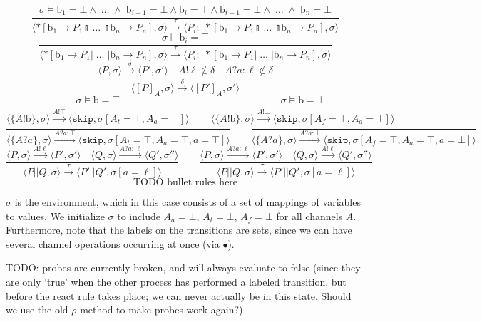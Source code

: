 \documentclass{article}
\begin{document}
$$    \frac{\sigma \models \mathrm{b}_1 = \bot \wedge \; \ldots \; \wedge \; \mathrm{b}_{i-1} = \bot \wedge \mathrm{b}_i = \top \wedge \mathrm{b}_{i+1} = \bot \wedge \; \ldots \; \wedge \; \mathrm{b}_n = \bot} {\langle *[ \mathrm{b}_1 \rightarrow P_1  \talloblong \; \ldots \; \talloblong \mathrm{b}_n \rightarrow P_n ] , \sigma \rangle \xrightarrow{\tau} \langle P_i; \; *[ \mathrm{b}_1 \rightarrow P_1  \talloblong \; \ldots \; \talloblong \mathrm{b}_n \rightarrow P_n ] , \sigma\rangle  } $$$$
    \frac{\sigma \models \mathrm{b}_i = \top} {\langle *[ \mathrm{b}_1 \rightarrow P_1  | \; \ldots \; | \mathrm{b}_n \rightarrow P_n ] , \sigma \rangle \xrightarrow{\tau} \langle P_i;\;*[ \mathrm{b}_1 \rightarrow P_1  | \; \ldots \; | \mathrm{b}_n \rightarrow P_n ] , \sigma\rangle  } $$$$
    \frac{\langle P, \sigma \rangle \xrightarrow{\delta} \langle P', \sigma' \rangle \quad A!\ell \not \in \delta \quad A?a:\ell \not \in \delta}{\langle [P]_A, \sigma \rangle \xrightarrow{\delta} \langle [P']_A, \sigma' \rangle} $$$$
    \frac{\sigma \models \mathrm{b} = \top}{\langle \{A!\mathrm{b}\}, \sigma \rangle \xrightarrow{A!\top} \langle \mathtt{skip}, \sigma[A_t = \top, A_a = \top] \rangle} \qquad
    \frac{\sigma \models \mathrm{b} = \bot}{\langle \{A!\mathrm{b}\}, \sigma \rangle \xrightarrow{A!\bot} \langle \mathtt{skip}, \sigma[A_f = \top, A_a = \top] \rangle} $$$$
    \frac{}{\langle \{A?a\}, \sigma \rangle \xrightarrow{A?a : \top} \langle \mathtt{skip}, \sigma[A_t = \top, A_a = \top, a = \top] \rangle} \qquad
    \frac{}{\langle \{A?a\}, \sigma \rangle \xrightarrow{A?a : \bot} \langle \mathtt{skip}, \sigma[A_f = \top, A_a = \top, a = \bot] \rangle} $$$$
    \frac{\langle P, \sigma \rangle \xrightarrow{A!\ell} \langle P', \sigma' \rangle \quad \langle Q, \sigma \rangle \xrightarrow {A?a : \ell} \langle Q', \sigma'' \rangle}{\langle P || Q, \sigma \rangle \xrightarrow{\tau} \langle P' || Q', \sigma[a = \ell] \rangle} \qquad
    \frac{\langle P, \sigma \rangle \xrightarrow{A?a : \ell} \langle P', \sigma' \rangle \quad \langle Q, \sigma \rangle \xrightarrow {A!\ell} \langle Q', \sigma'' \rangle}{\langle P || Q, \sigma \rangle \xrightarrow{\tau} \langle P' || Q', \sigma[a = \ell] \rangle}
    $$$$ \text{TODO bullet rules here}
$$

$\sigma$ is the environment, which in this case consists of a set of mappings of variables to values.
We initialize $\sigma$ to include $A_a = \bot$, $A_t = \bot$, $A_f = \bot$ for all channels $A$.
Furthermore, note that the labels on the transitions are sets, since we can have several channel operations occurring at once (via $\bullet$).

TODO: probes are currently broken, and will always evaluate to false (since they are only `true' when the other process has performed a labeled transition, but before the react rule takes place; we can never actually be in this state. Should we use the old $\rho$ method to make probes work again?)
\end{document}

